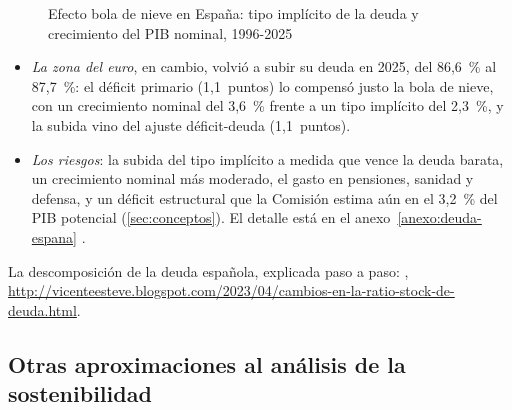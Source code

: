\documentclass[11pt]{article}
\begin{document}
\begin{figure}[H]
\centering
\caption{Efecto bola de nieve en España: tipo implícito de la deuda y crecimiento del PIB nominal, 1996-2025}\label{fig:bola-nieve-espana}
\end{figure}

\begin{itemize}
\item \emph{La zona del euro}, en cambio, volvió a subir su deuda en 2025, del 86,6~\% al 87,7~\%: el déficit primario (1,1~puntos) lo compensó justo la bola de nieve, con un crecimiento nominal del 3,6~\% frente a un tipo implícito del 2,3~\%, y la subida vino del ajuste déficit-deuda (1,1~puntos)\nocite{Eurostat2026EDP}.
\item \emph{Los riesgos}: la subida del tipo implícito a medida que vence la deuda barata, un crecimiento nominal más moderado, el gasto en pensiones, sanidad y defensa, y un déficit estructural que la Comisión estima aún en el 3,2~\% del PIB potencial (\ref{sec:conceptos}). El detalle está en el anexo~\ref{anexo:deuda-espana} .
\end{itemize}

\begin{anotaciones}
La descomposición de la deuda española, explicada paso a paso: \textcite{EstevePrats2023Cambios}, \url{http://vicenteesteve.blogspot.com/2023/04/cambios-en-la-ratio-stock-de-deuda.html}.
\end{anotaciones}

\subsection{Otras aproximaciones al análisis de la sostenibilidad}\label{sec:otras-aproximaciones}
\end{document}
